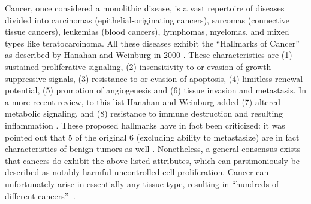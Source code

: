 \documentclass[12pt]{article}
\begin{document}
Cancer, once considered a monolithic disease, is a vast repertoire of diseases divided into carcinomas (epithelial-originating cancers), sarcomas (connective tissue cancers), leukemias (blood cancers), lymphomas, myelomas, and mixed types like teratocarcinoma. 
All these diseases exhibit the \textquotedblleft Hallmarks of Cancer\textquotedblright $\:$ as described by Hanahan and Weinburg in 2000 \cite{Hanahan2000}. 
These characteristics are (1) sustained proliferative signaling, (2) insensitivity to or evasion of growth-suppressive signals, (3) resistance to or evasion of apoptosis, (4) limitless renewal potential, (5) promotion of angiogenesis and (6) tissue invasion and metastasis. In a more recent review, to this list Hanahan and Weinburg added (7) altered metabolic signaling, and (8) resistance to immune destruction and resulting inflammation \cite{Hanahan2011}. 
These proposed hallmarks have in fact been criticized: it was pointed out that 5 of the original 6 (excluding ability to metastasize) are in fact characteristics of benign tumors as well \cite{Lazebnik2010}. 
Nonetheless, a general consensus exists that cancers do exhibit the above listed attributes, which can parsimoniously be described as notably harmful uncontrolled cell proliferation. 
Cancer can unfortunately arise in essentially any tissue type, resulting in \textquotedblleft hundreds of different cancers\textquotedblright $\:$ \cite{CancerGovClasses}.  
\end{document}
